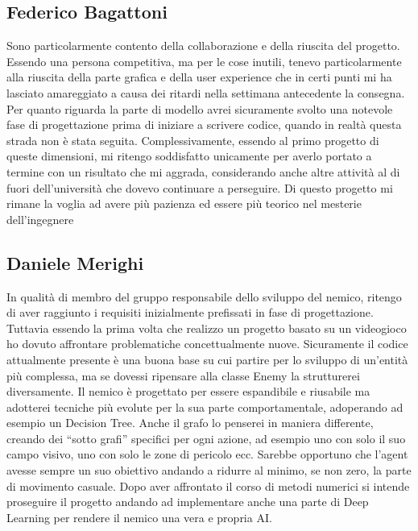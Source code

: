\documentclass[a4paper,12pt]{report}
\begin{document}
\subsection{Federico Bagattoni}
Sono particolarmente contento della collaborazione e della riuscita del progetto. Essendo una persona competitiva, ma per le cose inutili, tenevo particolarmente alla riuscita della parte grafica e della user experience che in certi punti mi ha lasciato amareggiato a causa dei ritardi nella settimana antecedente la consegna. 
Per quanto riguarda la parte di modello avrei sicuramente svolto una notevole fase di progettazione prima di iniziare a scrivere codice, quando in realtà questa strada non è stata seguita.
Complessivamente, essendo al primo progetto di queste dimensioni, mi ritengo soddisfatto unicamente per averlo portato a termine con un risultato che mi aggrada, considerando anche altre attività al di fuori dell'università che dovevo continuare a perseguire.
\newline
Di questo progetto mi rimane la voglia ad avere più pazienza ed essere più teorico nel mesterie dell'ingegnere

\subsection{Daniele Merighi}
\par
In qualità di membro del gruppo responsabile dello sviluppo del nemico, ritengo di aver raggiunto i requisiti inizialmente prefissati in fase di progettazione. Tuttavia essendo la prima volta che realizzo un progetto basato su un videogioco ho dovuto affrontare problematiche concettualmente nuove. Sicuramente il codice attualmente presente è una buona base su cui partire per lo sviluppo di un’entità più complessa, ma se dovessi ripensare alla classe Enemy la strutturerei diversamente. Il nemico è progettato per essere espandibile e riusabile ma adotterei tecniche più evolute per la sua parte comportamentale, adoperando ad esempio un Decision Tree. Anche il grafo lo penserei in maniera differente, creando dei “sotto grafi” specifici per ogni azione, ad esempio uno con solo il suo campo visivo, uno con solo le zone di pericolo ecc. Sarebbe opportuno che l’agent avesse sempre un suo obiettivo andando a ridurre al minimo, se non zero, la parte di movimento casuale. Dopo aver affrontato il corso di metodi numerici si intende proseguire il progetto andando ad implementare anche una parte di Deep Learning per rendere il nemico una vera e propria AI.
\end{document}
